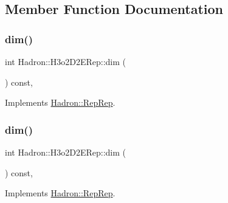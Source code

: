 \subsection{Member Function Documentation}
\mbox{\label{structHadron_1_1H3o2D2ERep_ad7e811309fce4b8ce92dd11fb8193cb2}} 
\subsubsection{\texorpdfstring{dim()}{dim()}\hspace{0.1cm}{\footnotesize\ttfamily [1/5]}}
{\footnotesize\ttfamily int Hadron\+::\+H3o2\+D2\+E\+Rep\+::dim (\begin{DoxyParamCaption}{ }\end{DoxyParamCaption}) const\hspace{0.3cm}{\ttfamily [inline]}, {\ttfamily [virtual]}}



Implements \mbox{\hyperlink{structHadron_1_1RepRep_a92c8802e5ed7afd7da43ccfd5b7cd92b}{Hadron\+::\+Rep\+Rep}}.

\mbox{\label{structHadron_1_1H3o2D2ERep_ad7e811309fce4b8ce92dd11fb8193cb2}} 
\subsubsection{\texorpdfstring{dim()}{dim()}\hspace{0.1cm}{\footnotesize\ttfamily [2/5]}}
{\footnotesize\ttfamily int Hadron\+::\+H3o2\+D2\+E\+Rep\+::dim (\begin{DoxyParamCaption}{ }\end{DoxyParamCaption}) const\hspace{0.3cm}{\ttfamily [inline]}, {\ttfamily [virtual]}}



Implements \mbox{\hyperlink{structHadron_1_1RepRep_a92c8802e5ed7afd7da43ccfd5b7cd92b}{Hadron\+::\+Rep\+Rep}}.

\mbox{\label{structHadron_1_1H3o2D2ERep_ad7e811309fce4b8ce92dd11fb8193cb2}} 
